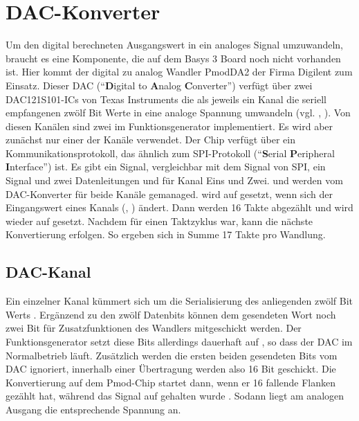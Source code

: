 \section{DAC-Konverter} \label{Comp:DAC}
Um den digital berechneten Ausgangswert in ein analoges Signal umzuwandeln, braucht es eine Komponente, die auf dem Basys 3 Board noch nicht vorhanden ist.
Hier kommt der digital zu analog Wandler PmodDA2 der Firma Digilent zum Einsatz.
Dieser DAC (``\textbf{D}igital to \textbf{A}nalog \textbf{C}onverter'') verfügt über zwei DAC121S101-ICs von Texas Instruments die als jeweils ein Kanal die seriell empfangenen zwölf Bit Werte in eine analoge Spannung umwandeln (vgl. \cite{DAC121S101}, \cite{PmodDA2}).
Von diesen Kanälen sind zwei im Funktionsgenerator implementiert.
Es wird aber zunächst nur einer der Kanäle verwendet.
Der Chip verfügt über ein Kommunikationsprotokoll, das ähnlich zum SPI-Protokoll (``\textbf{S}erial \textbf{P}eripheral \textbf{I}nterface'') ist.
Es gibt ein  Signal, vergleichbar mit dem  Signal von SPI, ein  Signal und zwei Datenleitungen  und  für Kanal Eins und Zwei.
 und  werden vom DAC-Konverter für beide Kanäle gemanaged.
 wird auf  gesetzt, wenn sich der Eingangswert eines Kanals (, ) ändert.
Dann werden 16 Takte abgezählt und  wird wieder auf  gesetzt.
Nachdem  für einen Taktzyklus  war, kann die nächste Konvertierung erfolgen.
So ergeben sich in Summe 17 Takte pro Wandlung.

\subsection{DAC-Kanal} \label{Comp:DAC:Channel}
Ein einzelner Kanal kümmert sich um die Serialisierung des anliegenden zwölf Bit Werts .
Ergänzend zu den zwölf Datenbits können dem gesendeten Wort noch zwei Bit für Zusatzfunktionen des Wandlers mitgeschickt werden.
Der Funktionsgenerator setzt diese Bits allerdings dauerhaft auf , so dass der DAC im Normalbetrieb läuft.
Zusätzlich werden die ersten beiden gesendeten Bits vom DAC ignoriert, innerhalb einer Übertragung werden also 16 Bit geschickt.
Die Konvertierung auf dem Pmod-Chip startet dann, wenn er 16 fallende  Flanken gezählt hat, während das  Signal auf  gehalten wurde \cite{DAC121S101}.
Sodann liegt am analogen Ausgang die entsprechende Spannung an.

